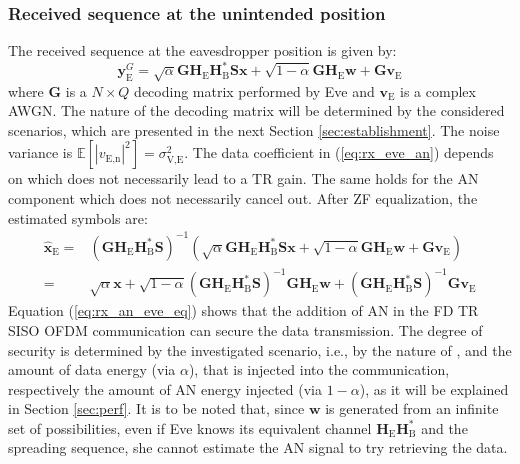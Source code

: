 \documentclass[journal,comsoc]{IEEEtran}
\newcommand{\EX}[1]{\mathbb{E} \left[#1\right]}%
\newcommand{\HE}{\textbf{H}_{\text{E}}}
\newcommand{\HB}{\textbf{H}_{\text{B}}}
\newcommand{\spread}{\textbf{S}}
\newcommand{\w}{\textbf{w}}
\newcommand{\mat}[1]{\boldsymbol{\mathrm{#1}}}
\begin{document}
\subsubsection{Received sequence at the unintended position}
The received sequence at the eavesdropper position is given by:
\begin{equation}
	\textbf{y}_{\text{E}}^G = \sqrt{\alpha}  \textbf{G} \HE \HB^* \spread\textbf{x} + \sqrt{1-\alpha} \textbf{G} \HE \w + \textbf{G}  \textbf{v}_\text{E}
	\label{eq:rx_eve_an}
\end{equation}
where $\textbf{G}$ is a $N \times Q$ decoding matrix performed by Eve and $\textbf{v}_\text{E}$ is a complex AWGN. The nature of the decoding matrix will be determined by the considered scenarios, which are presented in the next Section \ref{sec:establishment}. The noise variance is $\EX{|v_{\text{E,n}}|^2} = \sigma_{\text{V,E}}^2$.  The data coefficient in (\ref{eq:rx_eve_an}) depends on \mat{G} which does not necessarily lead to a TR gain. The same holds for the AN component which does not necessarily cancel out. After ZF equalization, the estimated symbols are:
\begin{equation}
	\begin{split}
		\hat{\textbf{x}}_{\text{E}} =& \left(\textbf{G} \HE \HB^* \spread \right)^{-1}
		\left( \sqrt{\alpha} \textbf{G} \HE \HB^* \spread \textbf{x} +   \sqrt{1-\alpha} \textbf{G} \HE \w  +  \textbf{G}  \textbf{v}_\text{E}  \right) \\
		=& \sqrt{\alpha}\textbf{x} + \sqrt{1-\alpha} \left(\textbf{G} \HE \HB^* \spread \right)^{-1}  \textbf{G} \HE \w + \left(\textbf{G} \HE \HB^* \spread \right)^{-1}  \textbf{G} \textbf{v}_\text{E}
	\end{split}
	\label{eq:rx_an_eve_eq}
\end{equation}
Equation (\ref{eq:rx_an_eve_eq}) shows that the addition of AN in the FD TR SISO OFDM communication can secure the data transmission. The degree of security is determined by the investigated scenario, i.e., by the nature of \mat{G}, and the amount of data energy (via $\alpha$), that is injected into the communication, respectively the amount of AN energy injected (via $1-\alpha$), as it will be explained in Section \ref{sec:perf}. It is to be noted that, since $\w$ is generated from an infinite set of possibilities, even if Eve knows its equivalent channel $\HE\HB^*$ and the spreading sequence, she cannot estimate the AN signal  to try retrieving the data. 
\end{document}

